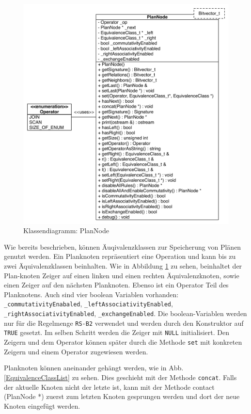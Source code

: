 \begin{figure}[ht]
  \centering
  \includegraphics[scale=0.75]{04_Implementierung/00_media/PlanNodeClass.pdf}
  \caption{Klassendiagramm: PlanNode}
  \label{PlanNodeClass}
\end{figure}

Wie bereits beschrieben, können Äuqivalenzklassen zur Speicherung von Plänen genutzt werden. Ein Planknoten repräsentiert eine Operation und kann bis zu zwei Äquivalenzklassen beinhalten. Wie in Abbildung \ref{PlanNodeClass} zu sehen, beinhaltet der Plan-knoten Zeiger auf einen linken und einen rechten Äquivalenzknoten, sowie einen Zeiger auf den nächsten Planknoten. Ebenso ist ein Operator Teil des Planknotens. Auch sind vier boolean Variablen vorhanden: \texttt{\_commutativity\-Enabaled}, \texttt{\_left\-Associativity\-Enabled},  \texttt{\_right\-Associativity\-Enabled},  \texttt{\_exchange\-Enabled}. Die boo\-lean-Variablen werden nur für die Regelmenge \texttt{RS-B2} verwendet und werden durch den Konstruktor auf \texttt{TRUE} gesetzt. Im selben Schritt werden die Zeiger mit \texttt{NULL} initialisiert. Den Zeigern und dem Operator können später durch die Methode \texttt{set} mit konkreten Zeigern und einem Operator zugewiesen werden.

Planknoten können aneinander gehängt werden, wie in Abb. \ref{EquivalenceClassList} zu sehen. Dies geschieht mit der Methode \texttt{concat}. Falls der aktuelle Knoten nicht der letzte ist, kann mit der Methode contact (PlanNode *) zuerst zum letzten Knoten gesprungen werden und dort der neue Knoten eingefügt werden. 

